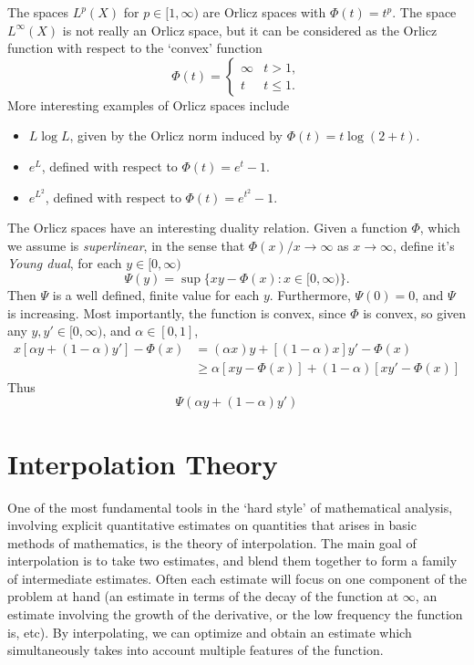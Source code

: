 The spaces $L^p(X)$ for $p \in [1,\infty)$ are Orlicz spaces with $\Phi(t) = t^p$. The space $L^\infty(X)$ is not really an Orlicz space, but it can be considered as the Orlicz function with respect to the `convex' function
%
\[ \Phi(t) = \begin{cases} \infty & t > 1, \\ t & t \leq 1. \end{cases} \]
%
More interesting examples of Orlicz spaces include
%
\begin{itemize}
    \item $L \log L$, given by the Orlicz norm induced by $\Phi(t) = t \log(2 + t)$.
    \item $e^L$, defined with respect to $\Phi(t) = e^t - 1$.
    \item $e^{L^2}$, defined with respect to $\Phi(t) = e^{t^2} - 1$.
\end{itemize}
%
The Orlicz spaces have an interesting duality relation. Given a function $\Phi$, which we assume is \emph{superlinear}, in the sense that $\Phi(x)/x \to \infty$ as $x \to \infty$, define it's \emph{Young dual}, for each $y \in [0,\infty)$
%
\[ \Psi(y) = \sup \{ xy - \Phi(x) : x \in [0,\infty) \}. \]
%
Then $\Psi$ is a well defined, finite value for each $y$. Furthermore, $\Psi(0) = 0$, and $\Psi$ is increasing. Most importantly, the function is convex, since $\Phi$ is convex, so given any $y,y' \in [0,\infty)$, and $\alpha \in [0,1]$,
%
\begin{align*}
    x[\alpha y + (1 - \alpha) y'] - \Phi(x) &= (\alpha x) y + [(1 - \alpha) x] y' - \Phi(x)\\
    &\geq \alpha [x y - \Phi(x)] + (1 - \alpha) [xy' - \Phi(x)]
\end{align*}
%
Thus
%
\[ \Psi(\alpha y + (1 - \alpha) y') \]















\chapter{Interpolation Theory}

One of the most fundamental tools in the `hard style' of mathematical analysis, involving explicit quantitative estimates on quantities that arises in basic methods of mathematics, is the theory of interpolation. The main goal of interpolation is to take two estimates, and blend them together to form a family of intermediate estimates. Often each estimate will focus on one component of the problem at hand (an estimate in terms of the decay of the function at $\infty$, an estimate involving the growth of the derivative, or the low frequency the function is, etc). By interpolating, we can optimize and obtain an estimate which simultaneously takes into account multiple features of the function.

